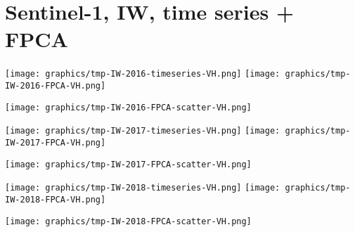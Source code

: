 
\section{Sentinel-1, IW, time series + FPCA}
\setcounter{theorem}{0}

\renewcommand{\theenumi}{\roman{enumi}}
\renewcommand{\labelenumi}{\textnormal{(\theenumi)}$\;\;$}


\begin{center}
\begin{minipage}{7.0in}
\texttt{[image: graphics/tmp-IW-2016-timeseries-VH.png]}
\quad
\texttt{[image: graphics/tmp-IW-2016-FPCA-VH.png]}
\vskip 1.0cm
\begin{center}
\texttt{[image: graphics/tmp-IW-2016-FPCA-scatter-VH.png]}
\end{center}
\end{minipage}
\end{center}


\begin{center}
\begin{minipage}{7.0in}
\texttt{[image: graphics/tmp-IW-2017-timeseries-VH.png]}
\quad
\texttt{[image: graphics/tmp-IW-2017-FPCA-VH.png]}
\vskip 1.0cm
\begin{center}
\texttt{[image: graphics/tmp-IW-2017-FPCA-scatter-VH.png]}
\end{center}
\end{minipage}
\end{center}


\begin{center}
\begin{minipage}{7.0in}
\texttt{[image: graphics/tmp-IW-2018-timeseries-VH.png]}
\quad
\texttt{[image: graphics/tmp-IW-2018-FPCA-VH.png]}
\vskip 1.0cm
\begin{center}
\texttt{[image: graphics/tmp-IW-2018-FPCA-scatter-VH.png]}
\end{center}
\end{minipage}
\end{center}


